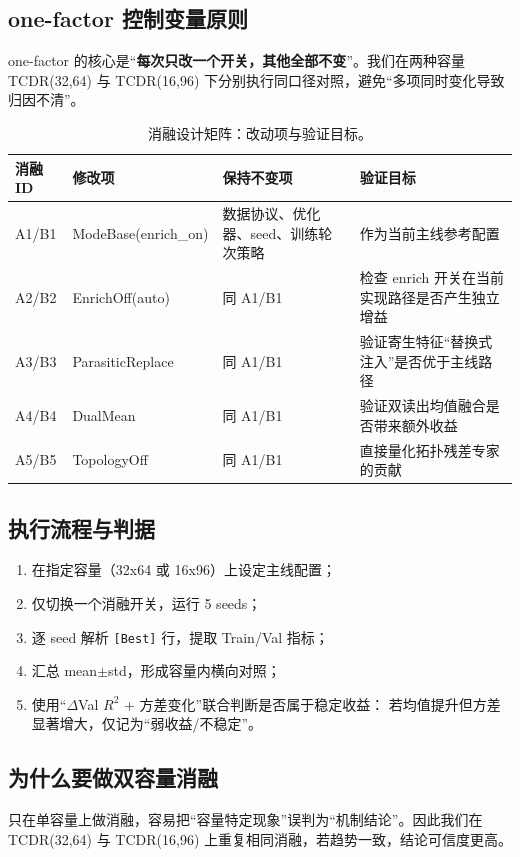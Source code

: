 \documentclass[12pt,a4paper]{ctexart}
\begin{document}
\subsection{one-factor 控制变量原则}
one-factor 的核心是“\textbf{每次只改一个开关，其他全部不变}”。我们在两种容量 TCDR(32,64) 与 TCDR(16,96) 下分别执行同口径对照，避免“多项同时变化导致归因不清”。

\begin{table}[htbp]
\centering
\scriptsize
\setlength{\tabcolsep}{4pt}
\begin{tabularx}{\textwidth}{l l X X}
\toprule
消融ID & 修改项 & 保持不变项 & 验证目标 \\
\midrule
A1/B1 & ModeBase(enrich\_on) & 数据协议、优化器、seed、训练轮次策略 & 作为当前主线参考配置 \\
A2/B2 & EnrichOff(auto) & 同 A1/B1 & 检查 enrich 开关在当前实现路径是否产生独立增益 \\
A3/B3 & ParasiticReplace & 同 A1/B1 & 验证寄生特征“替换式注入”是否优于主线路径 \\
A4/B4 & DualMean & 同 A1/B1 & 验证双读出均值融合是否带来额外收益 \\
A5/B5 & TopologyOff & 同 A1/B1 & 直接量化拓扑残差专家的贡献 \\
\bottomrule
\end{tabularx}
\caption{消融设计矩阵：改动项与验证目标。}
\end{table}

\subsection{执行流程与判据}
\begin{enumerate}
  \item 在指定容量（32x64 或 16x96）上设定主线配置；
  \item 仅切换一个消融开关，运行 5 seeds；
  \item 逐 seed 解析 \texttt{[Best]} 行，提取 Train/Val 指标；
  \item 汇总 mean$\pm$std，形成容量内横向对照；
  \item 使用“\(\Delta\)Val \(R^2\) + 方差变化”联合判断是否属于稳定收益：
  若均值提升但方差显著增大，仅记为“弱收益/不稳定”。
\end{enumerate}

\subsection{为什么要做双容量消融}
只在单容量上做消融，容易把“容量特定现象”误判为“机制结论”。因此我们在 TCDR(32,64) 与 TCDR(16,96) 上重复相同消融，若趋势一致，结论可信度更高。
\end{document}
